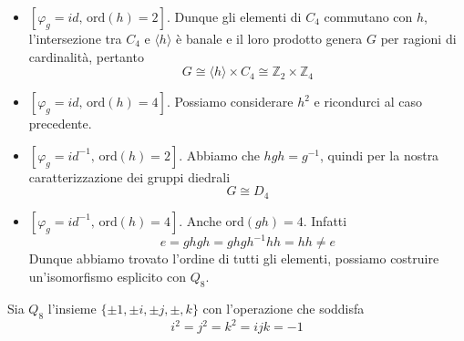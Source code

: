 \begin{multicols}{2}
\begin{itemize}
	\item $ \left[\varphi_g =  id, \, \text{ord}(h) =2\right] $. Dunque gli elementi di $ C_4 $ commutano con $ h $, l'intersezione tra $ C_4 $ e $ \langle h \rangle $ è banale e il loro prodotto genera $ G $ per ragioni di cardinalità, pertanto \[ G \cong  \langle h \rangle\times C_4  \cong  \mathbb{Z}_2\times\mathbb{Z}_4 \]
	\item $ \left[\varphi_g =  id, \, \text{ord}(h) =4\right] $. Possiamo considerare $ h^2 $ e ricondurci al caso precedente.
	\item $ \left[\varphi_g =  id^{-1}, \, \text{ord}(h) =2\right] $. Abbiamo che $ hgh = g^{-1} $, quindi per la nostra caratterizzazione dei gruppi diedrali \[ G \cong D_4 \]
	\item $ \left[\varphi_g =  id^{-1}, \, \text{ord}(h) =4\right] $. Anche ord$ (gh) = 4 $. Infatti
	\[ e = ghgh = ghgh^{-1}hh = hh \neq e \]
	Dunque abbiamo trovato l'ordine di tutti gli elementi, possiamo costruire un'isomorfismo esplicito con $ Q_8 $.
\end{itemize}
\begin{definition}[Quaternioni]
	Sia $ Q_8 $ l'insieme $ \{ \pm 1, \pm i, \pm j, \pm, k \} $ con l'operazione che soddisfa
	\[ i^2 = j^2 = k^2 = ijk = -1 \]
\end{definition}
\end{multicols}



